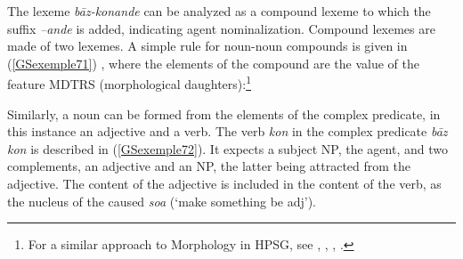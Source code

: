 \documentclass[output=paper
                ,modfonts
                ,nonflat
	        ,collection
	        ,collectionchapter
	        ,collectiontoclongg
 	        ,biblatex
                ,babelshorthands
                ,newtxmath
                ,draftmode
                ,colorlinks, citecolor=brown
]{./langsci/langscibook}
\begin{document}
{\begin{exe}
\end{exe}

The lexeme \emph{b\=az-konande} can be analyzed as a compound lexeme to which the suffix \emph{–ande} is added, indicating agent nominalization. Compound lexemes are made of two lexemes. A simple rule for noun-noun compounds is given in (\ref{GSexemple71}) \citep{bonami2018lexeme}, where the elements of the compound are the value of the feature MDTRS (morphological daughters):\footnote{For a similar approach to Morphology in HPSG, see \cite{Orgun96a}, \cite{Riehemann98a}, \cite{Koenig99a}, \cite{sag2003syntactic}.}

\begin{exe}
\end{exe}

Similarly, a noun can be formed from the elements of the complex predicate, in this instance an adjective and a verb. The verb \emph{kon} in the complex predicate \emph{b\=az kon} is described in (\ref{GSexemple72}). It expects a subject NP, the agent, and two complements, an adjective and an NP, the latter being attracted from the adjective. The content of the adjective is included in the content of the verb, as the nucleus of the caused \emph{soa} (`make something be adj').

}
\end{document}
